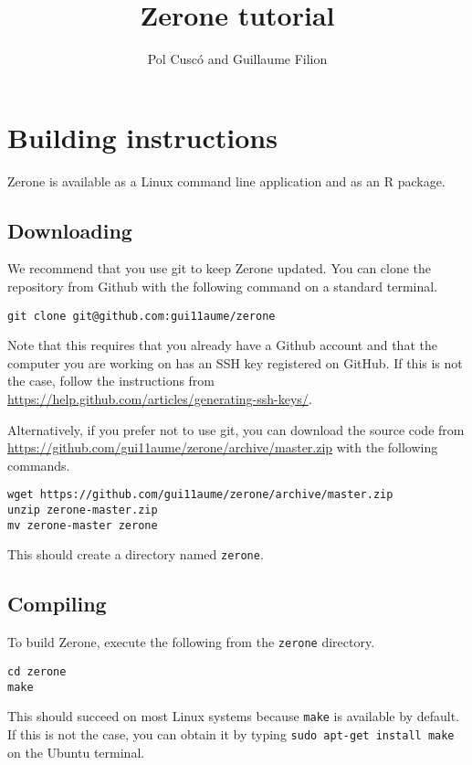 \documentclass[12pt]{article}
\title{Zerone tutorial}
\author{Pol Cusc\'o and Guillaume Filion}
\begin{document}
\maketitle

\section{Building instructions}

Zerone is available as a Linux command line application and as an R package.

\subsection{Downloading}

We recommend that you use git to keep Zerone updated. You can clone the
repository from Github with the following command on a standard terminal.

\begin{verbatim}
git clone git@github.com:gui11aume/zerone
\end{verbatim}

Note that this requires that you already have a Github account
and that the computer you are working on has an SSH key registered
on GitHub. If this is not the case, follow the instructions from
\url{https://help.github.com/articles/generating-ssh-keys/}.

Alternatively, if you prefer not to use git, you can download the source code
from \url{https://github.com/gui11aume/zerone/archive/master.zip} with the
following commands.

\begin{verbatim}
wget https://github.com/gui11aume/zerone/archive/master.zip
unzip zerone-master.zip
mv zerone-master zerone
\end{verbatim}

This should create a directory named \texttt{zerone}.

\subsection{Compiling}

To build Zerone, execute the following from the \texttt{zerone} directory.

\begin{verbatim}
cd zerone
make
\end{verbatim}

This should succeed on most Linux systems because \texttt{make} is
available by default. If this is not the case, you can obtain it by
typing \texttt{sudo apt-get install make} on the Ubuntu terminal.
\end{document}
